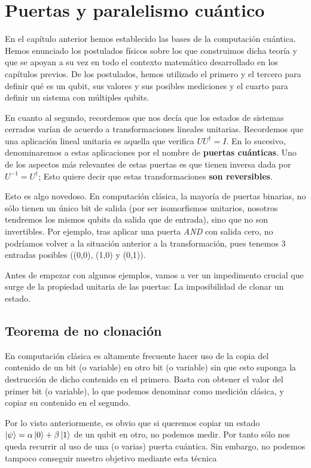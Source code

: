 \chapter{Puertas y paralelismo cuántico}

En el capítulo anterior hemos establecido las bases de la computación cuántica. Hemos enunciado los postulados físicos sobre los que construimos dicha teoría y que se apoyan a su vez en todo el contexto matemático desarrollado en los capítulos previos. De los postulados, hemos utilizado el primero y el tercero para definir qué es un qubit, sus valores y sus posibles mediciones y el cuarto para definir un sistema con múltiples qubits.

En cuanto al segundo, recordemos que nos decía que los estados de sistemas cerrados varían de acuerdo a transformaciones lineales unitarias. Recordemos que una aplicación lineal unitaria es aquella que verifica $UU^\dag=I$. En lo sucesivo, denominaremos a estas aplicaciones por el nombre de \textbf{puertas cuánticas}. Uno de los aspectos más relevantes de estas puertas es que tienen inversa dada por $U^{-1}=U^\dag$; Esto quiere decir que estas transformaciones \textbf{son reversibles}.

Esto es algo novedoso. En computación clásica, la mayoría de puertas binarias, no sólo tienen un único bit de salida (por ser isomorfismos unitarios, nosotros tendremos los mismos qubits da salida que de entrada), sino que no son invertibles. Por ejemplo, tras aplicar una puerta \textit{AND} con salida cero, no podríamos volver a la situación  anterior a la transformación, pues tenemos 3 entradas posibles ((0,0), (1,0) y (0,1)).

Antes de empezar con algunos ejemplos, vamos a ver un impedimento crucial que surge de la propiedad unitaria de las puertas: La imposibilidad de clonar un estado.

\section{Teorema de no clonación}
En computación clásica es altamente frecuente hacer uso de la copia del contenido de un bit (o variable) en otro bit (o variable) sin que esto suponga la destrucción de dicho contenido en el primero. Basta con obtener el valor del primer bit (o variable), lo que podemos denominar como medición clásica, y copiar su contenido en el segundo.

Por lo visto anteriormente, es obvio que si queremos copiar un estado $\left|\psi\right\rangle=\alpha\left|0\right\rangle+\beta\left|1\right\rangle$ de un qubit en otro, no podemos medir. Por tanto sólo nos queda recurrir al uso de una (o varias) puerta cuántica. Sin embargo, no podemos tampoco conseguir nuestro objetivo mediante esta técnica


